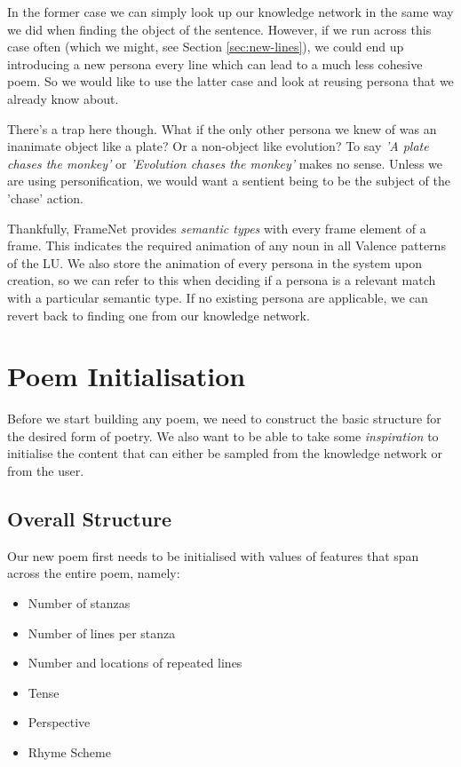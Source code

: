 In the former case we can simply look up our knowledge network in the same way we did when finding the object of the sentence. However, if we run across this case often (which we might, see Section \ref{sec:new-lines}), we could end up introducing a new persona every line which can lead to a much less cohesive poem. So we would like to use the latter case and look at reusing persona that we already know about.

There's a trap here though. What if the only other persona we knew of was an inanimate object like a plate? Or a non-object like evolution? To say \textit{'A plate chases the monkey'} or \textit{'Evolution chases the monkey'} makes no sense. Unless we are using personification, we would want a sentient being to be the subject of the 'chase' action.

Thankfully, FrameNet provides \textit{semantic types} with every frame element of a frame. This indicates the required animation of any noun in all Valence patterns of the LU. We also store the animation of every persona in the system upon creation, so we can refer to this when deciding if a persona is a relevant match with a particular semantic type. If no existing persona are applicable, we can revert back to finding one from our knowledge network.


\section{Poem Initialisation}

Before we start building any poem, we need to construct the basic structure for the desired form of poetry. We also want to be able to take some \textit{inspiration} to initialise the content that can either be sampled from the knowledge network or from the user.

\subsection{Overall Structure}
Our new poem first needs to be initialised with values of features that span across the entire poem, namely:
\begin{itemize}
\item{Number of stanzas}
\item{Number of lines per stanza}
\item{Number and locations of repeated lines}
\item{Tense}
\item{Perspective}
\item{Rhyme Scheme}
\end{itemize}


